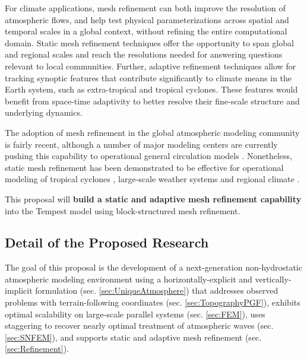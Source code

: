 \documentclass[11pt]{article}
\begin{document}
For climate applications, mesh refinement can both improve the resolution of atmospheric flows, and help test physical parameterizations across spatial and temporal scales in a global context, without refining the entire computational domain.  Static mesh refinement techniques offer the opportunity to span global and regional scales and reach the resolutions needed for answering questions relevant to local communities.  Further, adaptive refinement techniques allow for tracking synoptic features that contribute significantly to climate means in the Earth system, such as extra-tropical and tropical cyclones.  These features would benefit from space-time adaptivity to better resolve their fine-scale structure and underlying dynamics.

The adoption of mesh refinement in the global atmospheric modeling community is fairly recent, although a number of major modeling centers are currently pushing this capability to operational general circulation models \cite{skamarock2012mpas, LMHSJL2013MWR, CMZCJMAT2013MWR, mccorquodale2014adaptive}.   Nonetheless, static mesh refinement has been demonstrated to be effective for operational modeling of tropical cyclones \cite{zarzycki2014multidecadal, zarzycki2014using}, large-scale weather systems \cite{rauscher2014impact} and regional climate \cite{rauscher2013exploring, zarzycki2014aquaplanet}.

This proposal will \textbf{build a static and adaptive mesh refinement capability} into the Tempest model using block-structured mesh refinement.


\subsection{Detail of the Proposed Research} \label{sec:Research}

The goal of this proposal is the development of a next-generation non-hydrostatic atmospheric modeling environment using a horizontally-explicit and vertically-implicit formulation (sec. \ref{sec:UniqueAtmosphere}) that addresses observed problems with terrain-following coordinates (sec. \ref{sec:TopographyPGF}), exhibits optimal scalability on large-scale parallel systems (sec. \ref{sec:FEM}), uses staggering to recover nearly optimal treatment of atmospheric waves (sec. \ref{sec:SNFEM}), and supports static and adaptive mesh refinement (sec. \ref{sec:Refinement}).
\end{document}
